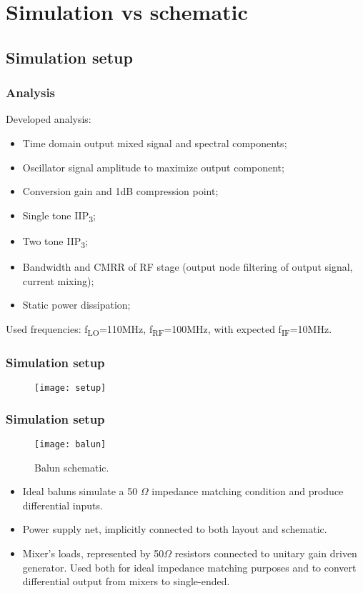 \section{Simulation vs schematic}
\subsection{Simulation setup}

\begin{frame}
	\tableofcontents[currentsubsection]
\end{frame}

\begin{frame}
\frametitle{Analysis}
	Developed analysis:
	\begin{itemize}
		\item Time domain output mixed signal and spectral components;
			\item Oscillator signal amplitude to maximize output component;
		\item Conversion gain and 1dB compression point;
		\item Single tone IIP\textsubscript{3};
		\item Two tone IIP\textsubscript{3};
		\item Bandwidth and CMRR of RF stage (output node filtering of output signal, current mixing);
		\item Static power dissipation;
	\end{itemize}
	Used frequencies: f\textsubscript{LO}=110MHz, f\textsubscript{RF}=100MHz, with expected f\textsubscript{IF}=10MHz.
\end{frame}

\begin{frame}
	\frametitle{Simulation setup}
	\begin{figure}[H]
		\centering %
		\texttt{[image: setup]}
		\label{fig:setup}
	\end{figure}
\end{frame}

\begin{frame}
	\frametitle{Simulation setup}
	\begin{figure}[H]
		\centering
		\texttt{[image: balun]}
		\caption{Balun schematic.}
		\label{fig:balun}
	\end{figure}
	\begin{itemize}
		\item Ideal baluns simulate a  50 \(\Omega\) impedance matching condition and produce differential inputs. 
		\item Power supply net, implicitly connected to both layout and schematic.
		\item Mixer's loads, represented by 50\(\Omega\) resistors connected to unitary gain driven generator. Used both for ideal impedance matching purposes and to convert differential output from mixers to single-ended.
	\end{itemize}
\end{frame}

